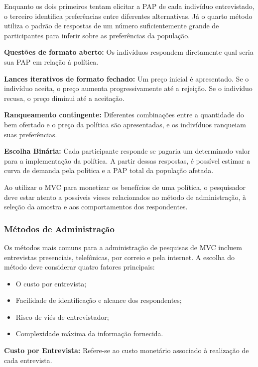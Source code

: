 \documentclass[12pt,letterpaper]{article}
\newcommand{\1}{\mathbbm{1}}
\numberwithin{equation}{section}
\begin{document}
Enquanto os dois primeiros tentam elicitar a PAP de cada indivíduo entrevistado, o terceiro identifica preferências entre diferentes alternativas. Já o quarto método utiliza o padrão de respostas de um número suficientemente grande de participantes para inferir sobre as preferências da população.

\textbf{Questões de formato aberto:} Os indivíduos respondem diretamente qual seria sua PAP em relação à política.

\textbf{Lances iterativos de formato fechado:} Um preço inicial é apresentado. Se o indivíduo aceita, o preço aumenta progressivamente até a rejeição. Se o indivíduo recusa, o preço diminui até a aceitação.

\textbf{Ranqueamento contingente:} Diferentes combinações entre a quantidade do bem ofertado e o preço da política são apresentadas, e os indivíduos ranqueiam suas preferências.

\textbf{Escolha Binária:} Cada participante responde se pagaria um determinado valor para a implementação da política. A partir dessas respostas, é possível estimar a curva de demanda pela política e a PAP total da população afetada.

Ao utilizar o MVC para monetizar os benefícios de uma política, o pesquisador deve estar atento a possíveis vieses relacionados ao método de administração, à seleção da amostra e aos comportamentos dos respondentes.

\subsubsection{Métodos de Administração}

Os métodos mais comuns para a administração de pesquisas de MVC incluem entrevistas presenciais, telefônicas, por correio e pela internet. A escolha do método deve considerar quatro fatores principais:

\begin{itemize}
    \item O custo por entrevista;
    \item Facilidade de identificação e alcance dos respondentes;
    \item Risco de viés de entrevistador;
    \item Complexidade máxima da informação fornecida.
\end{itemize}

\textbf{Custo por Entrevista:} Refere-se ao custo monetário associado à realização de cada entrevista.
\end{document}
